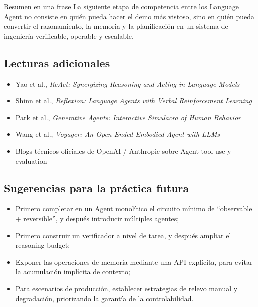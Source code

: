 \documentclass[a4paper]{article}
\begin{document}
\begin{importantbox}{Resumen en una frase}
La siguiente etapa de competencia entre los Language Agent no consiste en quién pueda hacer el demo más vistoso, sino en quién pueda convertir el razonamiento, la memoria y la planificación en un sistema de ingeniería verificable, operable y escalable.
\end{importantbox}

\subsection{Lecturas adicionales}
\begin{itemize}
    \item Yao et al., \textit{ReAct: Synergizing Reasoning and Acting in Language Models}
    \item Shinn et al., \textit{Reflexion: Language Agents with Verbal Reinforcement Learning}
    \item Park et al., \textit{Generative Agents: Interactive Simulacra of Human Behavior}
    \item Wang et al., \textit{Voyager: An Open-Ended Embodied Agent with LLMs}
    \item Blogs técnicos oficiales de OpenAI / Anthropic sobre Agent tool-use y evaluation
\end{itemize}

\subsection{Sugerencias para la práctica futura}
\begin{itemize}
    \item Primero completar en un Agent monolítico el circuito mínimo de ``observable + reversible'', y después introducir múltiples agentes;
    \item Primero construir un verificador a nivel de tarea, y después ampliar el reasoning budget;
    \item Exponer las operaciones de memoria mediante una API explícita, para evitar la acumulación implícita de contexto;
    \item Para escenarios de producción, establecer estrategias de relevo manual y degradación, priorizando la garantía de la controlabilidad.
\end{itemize}
\end{document}
